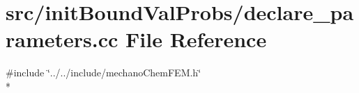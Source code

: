 \section{src/init\-Bound\-Val\-Probs/declare\-\_\-parameters.cc File Reference}
\label{init_bound_val_probs_2declare__parameters_8cc}
{\ttfamily \#include \char`\"{}../../include/mechano\-Chem\-F\-E\-M.\-h\char`\"{}}\\*
